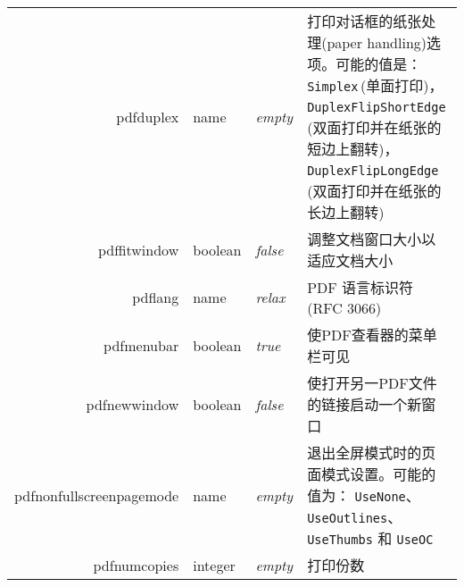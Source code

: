 \documentclass{article}
\begin{document}
\begin{longtable}{@{}>{\ttfamily}r>{\raggedright}p{}>{\itshape}lp{7cm}@{}}
  pdfduplex           & name           & empty                     & 打印对话框的纸张处理(paper handling)选项。可能的值是：
  \verb|Simplex|\,(单面打印)，
  \verb|DuplexFlipShortEdge|\,(双面打印并在纸张的短边上翻转)，
  \verb|DuplexFlipLongEdge|\,(双面打印并在纸张的长边上翻转)                                                                                                                                                                                                                                                     \\

  pdffitwindow        & boolean        & false                     & 调整文档窗口大小以适应文档大小                                                                                                                                                                                                              \\
  pdflang             & name           & relax                     & PDF 语言标识符 (RFC 3066)                                                                                                                                                                                                         \\
  pdfmenubar          & boolean        & true                      & 使PDF查看器的菜单栏可见                                                                                                                                                                                                                \\
  pdfnewwindow        & boolean        & false                     & 使打开另一PDF文件的链接启动一个新窗口                                                                                                                                                                                                         \\
  pdfnonfullscreenpagemode
                      & name           & empty                     & 退出全屏模式时的页面模式设置。可能的值为：
  \verb|UseNone|、\verb|UseOutlines|、\verb|UseThumbs| 和 \verb|UseOC|                                                                                                                                                                                                                               \\
  pdfnumcopies        & integer        & empty                     & 打印份数                                                                                                                                                                                                                         \\

\end{longtable}
\end{document}
